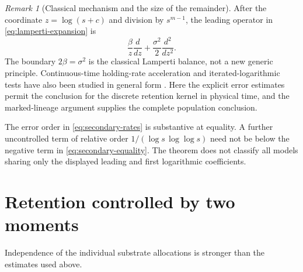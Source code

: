 \documentclass[11pt,a4paper]{article}
\theoremstyle{remark}\newtheorem{remark}[theorem]{Remark}
\begin{document}
\begin{remark}[Classical mechanism and the size of the remainder]\label{rem:lamperti}
After the coordinate $z=\log(s+c)$ and division by $s^{m-1}$, the leading operator in \eqref{eq:lamperti-expansion} is
\[
\frac{\beta}{z}\frac{d}{dz}+\frac{\sigma^2}{2}\frac{d^2}{dz^2}.
\]
The boundary $2\beta=\sigma^2$ is the classical Lamperti balance, not a new generic principle. Continuous-time holding-rate acceleration and iterated-logarithmic tests have also been studied in general form \cite{menshikov2014}. Here the explicit error estimates permit the conclusion for the discrete retention kernel in physical time, and the marked-lineage argument supplies the complete population conclusion.

The error order in \eqref{eq:secondary-rates} is substantive at equality. A further uncontrolled term of relative order $1/(\log s\,\log\log s)$ need not be below the negative term in \eqref{eq:secondary-equality}. The theorem does not classify all models sharing only the displayed leading and first logarithmic coefficients.
\end{remark}

\section{Retention controlled by two moments}\label{sec:moments}

Independence of the individual substrate allocations is stronger than the estimates used above.
\end{document}
